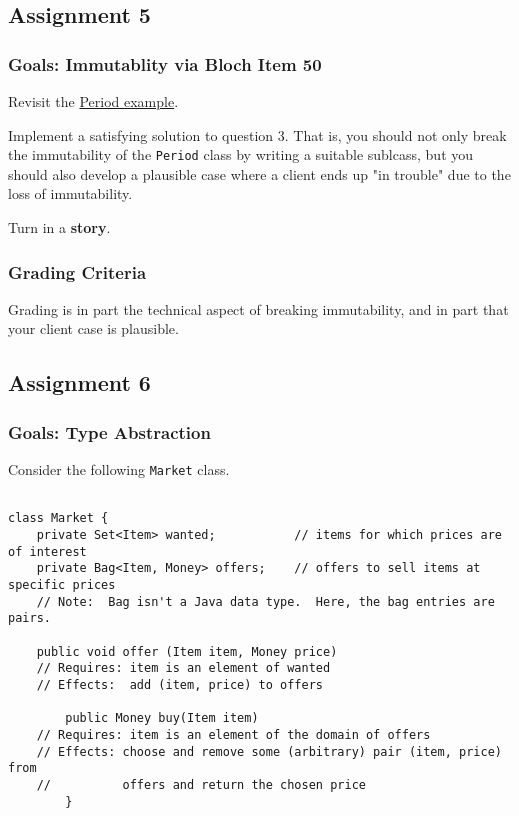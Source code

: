 \documentclass[11pt]{article}
\begin{document}
\subsection{Assignment 5}
\label{sec:orga934bb3}
\subsubsection{Goals: Immutablity via Bloch Item 50}
\label{sec:orgf8178c0}

Revisit the \hyperref[sec:org8a1b731]{Period example}.

Implement a satisfying solution to question 3. That is, you should not only break the immutability of the \texttt{Period} class by writing a suitable sublcass, but you should also develop a plausible case where a client ends up "in trouble" due to the loss of immutability.

Turn in a \textbf{story}.

\subsubsection{Grading Criteria}
\label{sec:org2cd30e9}

Grading is in part the technical aspect of breaking immutability, and in part that your client case is plausible.


\subsection{Assignment 6}
\label{sec:orgd546b4d}
\subsubsection{Goals: Type Abstraction}
\label{sec:org0c06e5e}

Consider the following \texttt{Market} class.

\begin{verbatim}

class Market {
    private Set<Item> wanted;           // items for which prices are of interest
    private Bag<Item, Money> offers;    // offers to sell items at specific prices
    // Note:  Bag isn't a Java data type.  Here, the bag entries are pairs.

    public void offer (Item item, Money price)
    // Requires: item is an element of wanted
    // Effects:  add (item, price) to offers

        public Money buy(Item item)
    // Requires: item is an element of the domain of offers
    // Effects: choose and remove some (arbitrary) pair (item, price) from
    //          offers and return the chosen price
        }

\end{verbatim}
\end{document}
